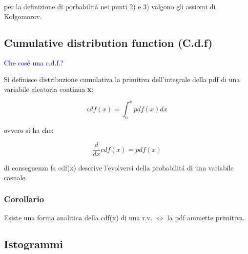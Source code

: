 \documentclass[11pt,a4paper]{book}
\begin{document}
 \noindent per la definizione di porbabilit\'{a} nei punti 2) e 3) valgono gli assiomi di Kolgomorov.
 
 
\begin{figure}[!ht]
	\vspace{0.2in}
    \centering
    \qquad
\end{figure}

\subsection{Cumulative distribution function (C.d.f)}

\textcolor{blue}{Che cos\'{e} una c.d.f.?} \newline

Si definisce distribuzione cumulativa la primitiva dell'integrale della pdf di una variabile aleatoria continua \textbf{x}:

\begin{equation}
	cdf(x) = \int_{a}^{x}{pdf(x)dx}
\end{equation}

\noindent ovvero si ha che:

\begin{equation}
	\dfrac{d}{dx}cdf(x)  = pdf(x)
\end{equation}

di conseguenza la cdf(x) descrive l'evolversi della probabilit\'{a} di una variabile casuale.

\subsubsection{Corollario}

Esiste una forma analitica della cdf(x) di una r.v. $\iff$ la pdf ammette primitiva. 

\begin{figure}[!ht]
	\vspace{0.2in}
    \centering
    \qquad
\end{figure}

\subsection{Istogrammi}
\end{document}
